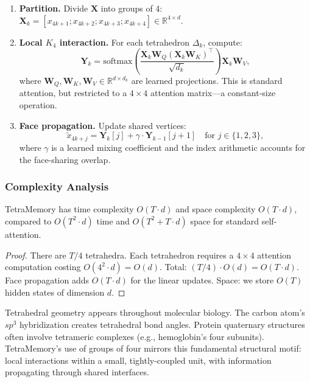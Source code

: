 \begin{enumerate}[leftmargin=1.5em]
\item \textbf{Partition.} Divide $\mathbf{X}$ into groups of 4: $\mathbf{X}_k = [x_{4k+1}; x_{4k+2}; x_{4k+3}; x_{4k+4}] \in \mathbb{R}^{4 \times d}$.

\item \textbf{Local $K_4$ interaction.} For each tetrahedron $\Delta_k$, compute:
\begin{equation}
\mathbf{Y}_k = \mathrm{softmax}\!\left(\frac{\mathbf{X}_k \mathbf{W}_Q (\mathbf{X}_k \mathbf{W}_K)^\top}{\sqrt{d_k}}\right) \mathbf{X}_k \mathbf{W}_V,
\label{eq:tetra-local}
\end{equation}
where $\mathbf{W}_Q, \mathbf{W}_K, \mathbf{W}_V \in \mathbb{R}^{d \times d_k}$ are learned projections. This is standard attention, but restricted to a $4 \times 4$ attention matrix---a constant-size operation.

\item \textbf{Face propagation.} Update shared vertices:
\begin{equation}
\tilde{x}_{4k+j} = \mathbf{Y}_k[j] + \gamma \cdot \mathbf{Y}_{k-1}[j+1] \quad \text{for } j \in \{1, 2, 3\},
\label{eq:face-prop}
\end{equation}
where $\gamma$ is a learned mixing coefficient and the index arithmetic accounts for the face-sharing overlap.
\end{enumerate}

\subsubsection{Complexity Analysis}

\begin{proposition}
\label{prop:tetra-complexity}
TetraMemory has time complexity $O(T \cdot d)$ and space complexity $O(T \cdot d)$, compared to $O(T^2 \cdot d)$ time and $O(T^2 + T \cdot d)$ space for standard self-attention.
\end{proposition}

\begin{proof}
There are $T/4$ tetrahedra. Each tetrahedron requires a $4 \times 4$ attention computation costing $O(4^2 \cdot d) = O(d)$. Total: $(T/4) \cdot O(d) = O(T \cdot d)$. Face propagation adds $O(T \cdot d)$ for the linear updates. Space: we store $O(T)$ hidden states of dimension $d$.
\end{proof}

\begin{bioinsight}
Tetrahedral geometry appears throughout molecular biology. The carbon atom's $sp^3$ hybridization creates tetrahedral bond angles. Protein quaternary structures often involve tetrameric complexes (e.g., hemoglobin's four subunits). TetraMemory's use of groups of four mirrors this fundamental structural motif: local interactions within a small, tightly-coupled unit, with information propagating through shared interfaces.
\end{bioinsight}

